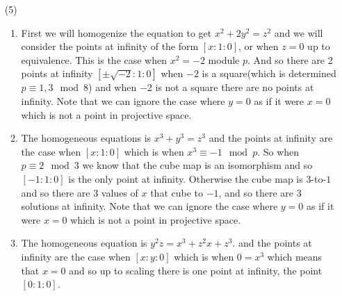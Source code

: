 \documentclass[12pt]{amsart}
\theoremstyle{definition}
\begin{document}
\begin{itemize}
\item[(5)]
\begin{enumerate}[label=(\alph*)]
    \item First we will homogenize the equation to get $x^2+2y^2=z^2$ and we will consider the points at infinity of the form $[x:1:0]$, or when $z=0$ up to equivalence. This is the case when $x^2=-2$ module $p$. And so there are 2 points at infinity $[\pm\sqrt{-2}:1:0]$ when $-2$ is a square(which is determined $p\equiv 1,3\mod 8$) and when $-2$ is not a square there are no points at infinity. Note that we can ignore the case where $y=0$ as if it were $x=0$ which is not a point in projective space.\\%
    \item The homogeneous equations is $x^3+y^3=z^3$ and the points at infinity are the case when $[x:1:0]$ which is when $x^3\equiv -1\mod p$. So when $p\equiv 2\mod 3$ we know that the cube map is an isomorphism and so $[-1:1:0]$ is the only point at infinity. Otherwise the cube map is $3$-to-$1$ and so there are $3$ values of $x$ that cube to $-1$, and so there are $3$ solutions at infinity. Note that we can ignore the case where $y=0$ as if it were $x=0$ which is not a point in projective space.\\%
    \item The homogeneous equation is $y^2z=x^3+z^2x+z^3$. and the points at infinity are the case when $[x:y:0]$ which is when $0=x^3$ which means that $x=0$ and so up to scaling there is one point at infinity, the point $[0:1:0]$.
\end{enumerate}

\end{itemize}
\end{document}
